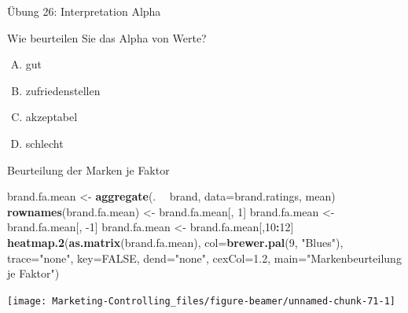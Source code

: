 \documentclass[12pt,ngerman,a4paper,ignorenonframetext,]{beamer}
\newenvironment{Shaded}{\begin{snugshade}}{\end{snugshade}}
\newcommand{\DataTypeTok}[1]{\textcolor[rgb]{0.13,0.29,0.53}{#1}}
\newcommand{\DecValTok}[1]{\textcolor[rgb]{0.00,0.00,0.81}{#1}}
\newcommand{\FloatTok}[1]{\textcolor[rgb]{0.00,0.00,0.81}{#1}}
\newcommand{\KeywordTok}[1]{\textcolor[rgb]{0.13,0.29,0.53}{\textbf{#1}}}
\newcommand{\NormalTok}[1]{#1}
\newcommand{\OperatorTok}[1]{\textcolor[rgb]{0.81,0.36,0.00}{\textbf{#1}}}
\newcommand{\OtherTok}[1]{\textcolor[rgb]{0.56,0.35,0.01}{#1}}
\newcommand{\StringTok}[1]{\textcolor[rgb]{0.31,0.60,0.02}{#1}}
\providecommand{\tightlist}{%
  \setlength{\itemsep}{0pt}\setlength{\parskip}{0pt}}
\begin{document}
\begin{frame}{Übung 26: Interpretation Alpha}
\protect\hypertarget{ubung-26-interpretation-alpha}{}

Wie beurteilen Sie das Alpha von Werte?

\begin{enumerate}
[A.]
\tightlist
\item
  gut
\item
  zufriedenstellen
\item
  akzeptabel
\item
  schlecht
\end{enumerate}


\end{frame}

\begin{frame}{Beurteilung der Marken je Faktor}
\protect\hypertarget{beurteilung-der-marken-je-faktor}{}

\begin{Shaded}
\begin{Highlighting}[]
\NormalTok{brand.fa.mean <-}\StringTok{ }\KeywordTok{aggregate}\NormalTok{(. }\OperatorTok{~}\StringTok{ }\NormalTok{brand, }\DataTypeTok{data=}\NormalTok{brand.ratings, mean)}
\KeywordTok{rownames}\NormalTok{(brand.fa.mean) <-}\StringTok{ }\NormalTok{brand.fa.mean[, }\DecValTok{1}\NormalTok{]}
\NormalTok{brand.fa.mean <-}\StringTok{ }\NormalTok{brand.fa.mean[, }\DecValTok{-1}\NormalTok{]}
\NormalTok{brand.fa.mean <-}\StringTok{ }\NormalTok{brand.fa.mean[,}\DecValTok{10}\OperatorTok{:}\DecValTok{12}\NormalTok{]}
\KeywordTok{heatmap.2}\NormalTok{(}\KeywordTok{as.matrix}\NormalTok{(brand.fa.mean), }
          \DataTypeTok{col=}\KeywordTok{brewer.pal}\NormalTok{(}\DecValTok{9}\NormalTok{, }\StringTok{"Blues"}\NormalTok{), }\DataTypeTok{trace=}\StringTok{"none"}\NormalTok{, }\DataTypeTok{key=}\OtherTok{FALSE}\NormalTok{, }\DataTypeTok{dend=}\StringTok{"none"}\NormalTok{,}
          \DataTypeTok{cexCol=}\FloatTok{1.2}\NormalTok{, }\DataTypeTok{main=}\StringTok{"Markenbeurteilung je Faktor"}\NormalTok{)}
\end{Highlighting}
\end{Shaded}

\begin{center}\texttt{[image: Marketing-Controlling\_files/figure-beamer/unnamed-chunk-71-1]} \end{center}

\end{frame}
\end{document}

